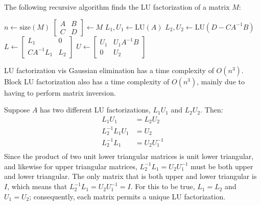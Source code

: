 \documentclass{article}
\begin{document}
The following recursive algorithm finds the LU factorization of a matrix $M$:\
\begin{algorithm}
\caption{LU}
\begin{algorithmic}
\State $n \gets \textrm{size}(M)$
\State $\begin{bmatrix} A & B \\ C & D \end{bmatrix} \gets M$
\State $L_1, U_1 \gets \textrm{LU}(A)$
\State $L_2, U_2 \gets \textrm{LU}(D - CA^{-1}B)$
\State $L \gets \begin{bmatrix} L_1 & 0 \\ CA^{-1}L_1 & L_2 \end{bmatrix}$
\State $U \gets \begin{bmatrix}U_1 & U_1A^{-1}B \\ 0 & U_2\end{bmatrix}$
\end{algorithmic}
\end{algorithm}
LU factorization vis Gaussian elimination has a time complexity of $O(n^3)$. Block LU factorization also has a time complexity of $O(n^3)$, mainly due to having to perform matrix inversion.

\clearpage

\problem{}
Suppose $A$ has two different LU factorizations, $L_1U_1$ and $L_2U_2$. Then:
\begin{align*}
    L_1U_1 & = L_2U_2 \\
    L_2^{-1}L_1U_1 & = U_2 \\
    L_2^{-1}L_1 & = U_2U_1^{-1} \\
\end{align*}
Since the product of two unit lower triangular matrices is unit lower triangular, and likewise for upper triangular matrices, $L_2^{-1}L_1 = U_2U_1^{-1}$ must be both upper and lower triangular. The only matrix that is both upper and lower triangular is $I$, which means that $L_2^{-1}L_1 = U_2U_1^{-1} = I$. For this to be true, $L_1 = L_2$ and $U_1 = U_2$; consequently, each matrix permits a unique LU factorization.

\clearpage
\end{document}
